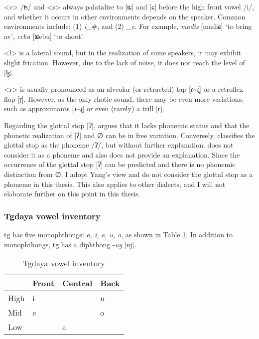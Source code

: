 <c> /ʦ/ and <s> always palatalize to [ʨ] and [ɕ] before the high front vowel /i/, and whether it occurs in other environments depends on the speaker. Common environments include: (1) \textit{i}\_\#, and (2) \_\textit{e}. For example, \textit{madis} [madiɕ] `to bring \acs{av}', \textit{cebu} [ʨebu] `to shoot'. 

<l> is a lateral sound, but in the realization of some speakers, it may exhibit slight frication. However, due to the lack of noise, it does not reach the level of [ɮ].

<r> is usually pronounced as an alveolar (or retracted) tap [ɾ\~{}ɾ̠] or a retroflex flap [ɽ]. However, as the only rhotic sound, there may be even more variations, such as approximants [ɹ\~{}ɻ] or even (rarely) a trill [r].

Regarding the glottal stop [ʔ], \textcite{yang1976sedpho} argues that it lacks phonemic status and that the phonetic realization of [ʔ] and ∅ can be in free variation. Conversely, \textcite{holmer1996parametric} classifies the glottal stop as the phoneme /ʔ/, but without further explanation. \textcite{Sung2018Sedgrammar} does not consider it as a phoneme and also does not provide an explanation. Since the occurrence of the glottal stop [ʔ] can be predicted and there is no phonemic distinction from ∅, I adopt Yang's view and do not consider the glottal stop as a phoneme in this thesis. This also applies to other dialects, and I will not elaborate further on this point in this thesis.

\subsubsection{Tgdaya vowel inventory}

\acl{tg} has five monophthongs: \textit{a, i, e, u, o}, as shown in Table \ref{tab:tgV}. In addition to monophthongs, \acl{tg} has a diphthong -\textit{uy} [uj]. 

\begin{table}[!htbp]
\centering
\caption{Tgdaya vowel inventory}
\label{tab:tgV}
\begin{tabular}{llll}
\hline
     & Front & Central & Back \\ \hline
High &  i    &         &  u   \\
Mid  &  e    &         &  o   \\
Low  &       &  a      &      \\ \hline
\end{tabular}
\end{table}

